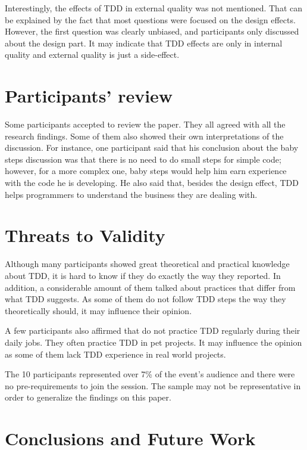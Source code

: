 Interestingly, the effects of TDD in external quality was not mentioned. That
can be explained by the fact that most questions were focused on the design
effects. However, the first question was clearly unbiased, and participants only
discussed about the design part. It may indicate that TDD effects are only in
internal quality and external quality is just a side-effect.

\section{Participants' review}
\label{sec:review}

Some participants accepted to review the paper. They all agreed with all
the research findings. 
Some of them also showed their own interpretations of the discussion. For
instance, one participant said that his conclusion about the baby steps discussion was
that there is no need to do small steps for simple code; however, for a more
complex one, baby steps would help him earn experience with the code he is
developing. He also said that, besides the design effect, TDD helps programmers
to understand the business they are dealing with.

\section{Threats to Validity}
\label{sec:threats-to-validity}

Although many participants showed great theoretical and practical knowledge
about TDD, it is hard to know if they do exactly the way they reported.
In addition, a considerable amount of them talked about practices that differ
from what TDD suggests.
As some of them do not follow TDD steps the way they theoretically should, it
may influence their opinion.

A few participants also affirmed that do not practice TDD regularly during their
daily jobs. They often practice TDD in pet projects. It may influence the
opinion as some of them lack TDD experience in real world projects.

The 10 participants represented over 7\% of the event's audience and there were
no pre-requirements to join the session. The sample may not be representative in
order to generalize the findings on this paper.

\section{Conclusions and Future Work}

